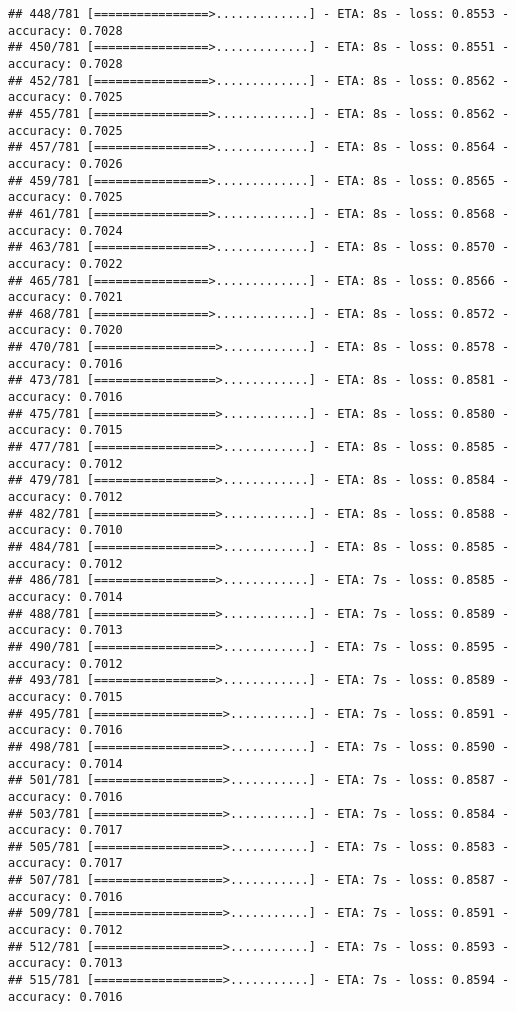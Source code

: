 \documentclass[
]{article}
\begin{document}
\begin{verbatim}
## 448/781 [================>.............] - ETA: 8s - loss: 0.8553 - accuracy: 0.7028
## 450/781 [================>.............] - ETA: 8s - loss: 0.8551 - accuracy: 0.7028
## 452/781 [================>.............] - ETA: 8s - loss: 0.8562 - accuracy: 0.7025
## 455/781 [================>.............] - ETA: 8s - loss: 0.8562 - accuracy: 0.7025
## 457/781 [================>.............] - ETA: 8s - loss: 0.8564 - accuracy: 0.7026
## 459/781 [================>.............] - ETA: 8s - loss: 0.8565 - accuracy: 0.7025
## 461/781 [================>.............] - ETA: 8s - loss: 0.8568 - accuracy: 0.7024
## 463/781 [================>.............] - ETA: 8s - loss: 0.8570 - accuracy: 0.7022
## 465/781 [================>.............] - ETA: 8s - loss: 0.8566 - accuracy: 0.7021
## 468/781 [================>.............] - ETA: 8s - loss: 0.8572 - accuracy: 0.7020
## 470/781 [=================>............] - ETA: 8s - loss: 0.8578 - accuracy: 0.7016
## 473/781 [=================>............] - ETA: 8s - loss: 0.8581 - accuracy: 0.7016
## 475/781 [=================>............] - ETA: 8s - loss: 0.8580 - accuracy: 0.7015
## 477/781 [=================>............] - ETA: 8s - loss: 0.8585 - accuracy: 0.7012
## 479/781 [=================>............] - ETA: 8s - loss: 0.8584 - accuracy: 0.7012
## 482/781 [=================>............] - ETA: 8s - loss: 0.8588 - accuracy: 0.7010
## 484/781 [=================>............] - ETA: 8s - loss: 0.8585 - accuracy: 0.7012
## 486/781 [=================>............] - ETA: 7s - loss: 0.8585 - accuracy: 0.7014
## 488/781 [=================>............] - ETA: 7s - loss: 0.8589 - accuracy: 0.7013
## 490/781 [=================>............] - ETA: 7s - loss: 0.8595 - accuracy: 0.7012
## 493/781 [=================>............] - ETA: 7s - loss: 0.8589 - accuracy: 0.7015
## 495/781 [==================>...........] - ETA: 7s - loss: 0.8591 - accuracy: 0.7016
## 498/781 [==================>...........] - ETA: 7s - loss: 0.8590 - accuracy: 0.7014
## 501/781 [==================>...........] - ETA: 7s - loss: 0.8587 - accuracy: 0.7016
## 503/781 [==================>...........] - ETA: 7s - loss: 0.8584 - accuracy: 0.7017
## 505/781 [==================>...........] - ETA: 7s - loss: 0.8583 - accuracy: 0.7017
## 507/781 [==================>...........] - ETA: 7s - loss: 0.8587 - accuracy: 0.7016
## 509/781 [==================>...........] - ETA: 7s - loss: 0.8591 - accuracy: 0.7012
## 512/781 [==================>...........] - ETA: 7s - loss: 0.8593 - accuracy: 0.7013
## 515/781 [==================>...........] - ETA: 7s - loss: 0.8594 - accuracy: 0.7016

\end{verbatim}
\end{document}
